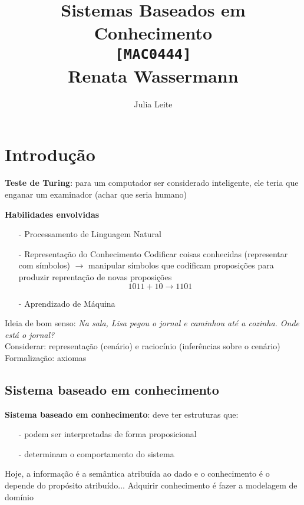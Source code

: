 \documentclass{article}
\title{Sistemas Baseados em Conhecimento\\
    \large \texttt{[MAC0444]}\\
    \large Renata Wassermann}
\author{Julia Leite}
\begin{document}
    
\maketitle

\tableofcontents

\section{Introdução}

\textbf{Teste de Turing}: para um computador ser considerado inteligente, ele
teria que enganar um examinador (achar que seria humano)

\textbf{Habilidades envolvidas}

\begin{itemize}
    \item [-] Processamento de Linguagem Natural
           
    \item [-] Representação do Conhecimento
        Codificar coisas conhecidas (representar com símbolos) $\rightarrow$ 
        manipular símbolos que codificam proposições para produzir reprentação de 
        novas proposições 
        $$1011 + 10 \rightarrow 1101$$
    
    \item [-] Aprendizado de Máquina
\end{itemize}

Ideia de bom senso: \textit{Na sala, Lisa pegou o jornal e caminhou até a cozinha. Onde está o jornal?}\\
Considerar: representação (cenário) e raciocínio (inferências sobre o cenário)\\
Formalização: axiomas

\subsection{Sistema baseado em conhecimento}

\textbf{Sistema baseado em conhecimento}: deve ter estruturas que:

\begin{itemize}
    \item [-] podem ser interpretadas de forma proposicional
    \item [-] determinam o comportamento do sistema
\end{itemize}

Hoje, a informação é a semântica atribuída ao dado e o conhecimento 
é o depende do propósito atribuído... Adquirir conhecimento é fazer a
modelagem de domínio
\end{document}
